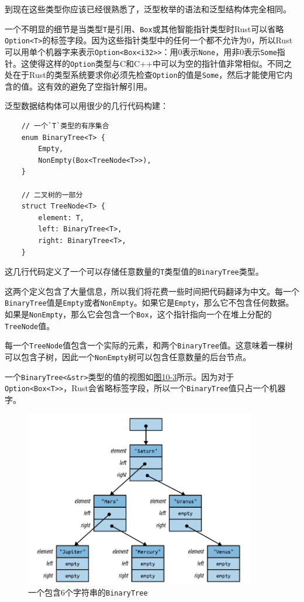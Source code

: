 到现在这些类型你应该已经很熟悉了，泛型枚举的语法和泛型结构体完全相同。

一个不明显的细节是当类型\texttt{T}是引用、\texttt{Box}或其他智能指针类型时Rust可以省略\texttt{Option<T>}的标签字段。因为这些指针类型中的任何一个都不允许为0，所以Rust可以用单个机器字来表示\texttt{Option<Box<i32>>}：用0表示\texttt{None}，用非0表示\texttt{Some}指针。这使得这样的\texttt{Option}类型与C和C++中可以为空的指针值非常相似。不同之处在于Rust的类型系统要求你必须先检查\texttt{Option}的值是\texttt{Some}，然后才能使用它内含的值。这有效的避免了空指针解引用。

泛型数据结构体可以用很少的几行代码构建：
\begin{verbatim}
    // 一个`T`类型的有序集合
    enum BinaryTree<T> {
        Empty,
        NonEmpty(Box<TreeNode<T>>),
    }

    // 二叉树的一部分
    struct TreeNode<T> {
        element: T,
        left: BinaryTree<T>,
        right: BinaryTree<T>,
    }
\end{verbatim}

这几行代码定义了一个可以存储任意数量的\texttt{T}类型值的\texttt{BinaryTree}类型。

这两个定义包含了大量信息，所以我们将花费一些时间把代码翻译为中文。每一个\texttt{BinaryTree}值是\texttt{Empty}或者\texttt{NonEmpty}。如果它是\texttt{Empty}，那么它不包含任何数据。如果是\texttt{NonEmpty}，那么它会包含一个\texttt{Box}，这个指针指向一个在堆上分配的\texttt{TreeNode}值。

每一个\texttt{TreeNode}值包含一个实际的元素，和两个\texttt{BinaryTree}值。这意味着一棵树可以包含子树，因此一个\texttt{NonEmpty}树可以包含任意数量的后台节点。

一个\texttt{BinaryTree<\&str>}类型的值的视图如\hyperref[f10-3]{图10-3}所示。因为对于\texttt{Option<Box<T>>}，Rust会省略标签字段，所以一个\texttt{BinaryTree}值只占一个机器字。

\begin{figure}[htbp]
    \centering
    \includegraphics[width=0.9\textwidth]{../img/f10-3.png}
    \caption{一个包含6个字符串的\texttt{BinaryTree}}
    \label{f10-3}
\end{figure}

